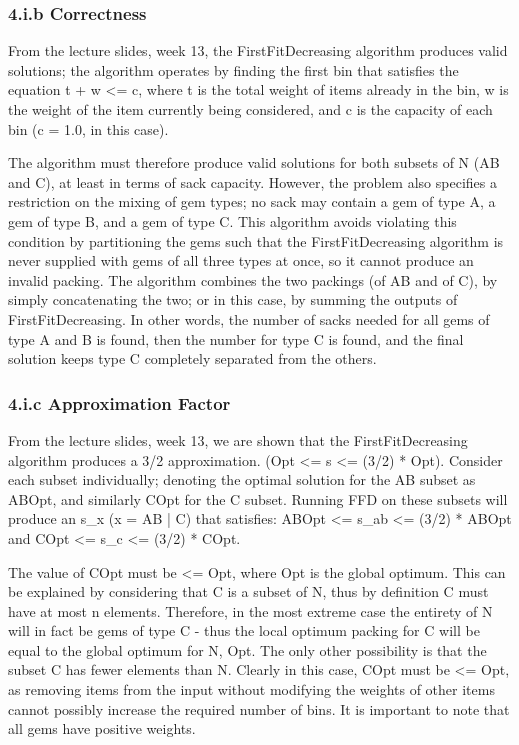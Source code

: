\documentclass[paper=a4, fontsize=12pt]{article}
\begin{document}
\subsubsection{4.i.b Correctness}
From the lecture slides, week 13, the FirstFitDecreasing algorithm produces valid solutions; the algorithm operates by finding the first bin that satisfies the equation t + w <= c, where t is the total weight of items already in the bin, w is the weight of the item currently being considered, and c is the capacity of each bin (c = 1.0, in this case).

The algorithm must therefore produce valid solutions for both subsets of N (AB and C), at least in terms of sack capacity. However, the problem also specifies a restriction on the mixing of gem types; no sack may contain a gem of type A, a gem of type B, and a gem of type C. This algorithm avoids violating this condition by partitioning the gems such that the FirstFitDecreasing algorithm is never supplied with gems of all three types at once, so it cannot produce an invalid packing. The algorithm combines the two packings (of AB and of C), by simply concatenating the two; or in this case, by summing the outputs of FirstFitDecreasing. In other words, the number of sacks needed for all gems of type A and B is found, then the number for type C is found, and the final solution keeps type C completely separated from the others.

\subsubsection{4.i.c Approximation Factor}
From the lecture slides, week 13, we are shown that the FirstFitDecreasing algorithm produces a 3/2 approximation. (Opt <= s <= (3/2) * Opt). Consider each subset individually; denoting the optimal solution for the AB subset as ABOpt, and similarly COpt for the C subset. Running FFD on these subsets will produce an s_x (x = AB | C) that satisfies: ABOpt <= s_ab <= (3/2) * ABOpt and COpt <= s_c <= (3/2) * COpt.

The value of COpt must be <= Opt, where Opt is the global optimum. This can be explained by considering that C is a subset of N, thus by definition C must have at most n elements. Therefore, in the most extreme case the entirety of N will in fact be gems of type C - thus the local optimum packing for C will be equal to the global optimum for N, Opt. The only other possibility is that the subset C has fewer elements than N. Clearly in this case, COpt must be <= Opt, as removing items from the input without modifying the weights of other items cannot possibly increase the required number of bins. It is important to note that all gems have positive weights.
\end{document}
